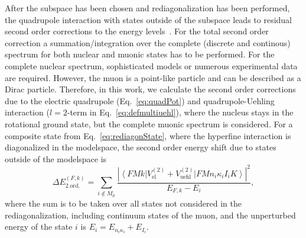 After the subspace has been chosen and rediagonalization has been performed, the quadrupole interaction with states outside of the subspace leads to residual second order corrections to the energy levels~\cite{chen1970}. 
For the total second order correction a summation/integration over the complete (discrete and continous) spectrum for both nuclear and muonic states has to be performed. For the complete nuclear spectrum, sophisticated models or numerous experimental data are required. However, the muon is a point-like particle and can be described as a Dirac particle. Therefore, in this work, we calculate the second order corrections due to the electric quadrupole (Eq.~\eqref{eq:quadPot}) and quadrupole-Uehling interaction (${l}{=}{2}$-term in Eq.~\eqref{eq:defmultiuehl}), where the nucleus stays in the rotational ground state, but the complete muonic spectrum is considered.
For a composite state from Eq.~\eqref{eq:rediagonState}, where the hyperfine interaction is diagonalized in the modelspace, the second order energy shift due to states outside of the modelspace is
\begin{equation}
\Delta E_{\text{2.ord.}}^{(F,k)}= \sum_{i\notin M_{\mu}}\frac{\left|\left< FMk\right|{V_{\text{el}}^{(2)}}{+}{V_{\text{uehl}}^{(2)}}\left|FMn_i\kappa_iI_iK \right>\right|^2}{E_{F,k}-E_i},
\label{eq:second}
\end{equation}
where the sum is to be taken over all states not considered in the rediagonalization, including continuum states of the muon, and the unperturbed energy of the state $i$ is $E_i=E_{n_i\kappa_i}+E_{I_i}$.













